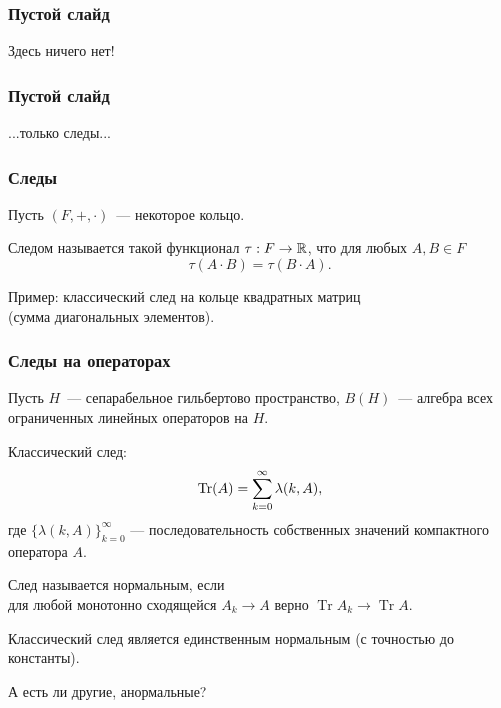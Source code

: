 \begin{frame}\frametitle{Пустой слайд}

	Здесь ничего нет!
\end{frame}

\begin{frame}\frametitle{Пустой слайд}

	...только следы...
\end{frame}




\begin{frame}\frametitle{Следы}
	Пусть $(F, +, \cdot)$~--- некоторое кольцо.
	\begin{ddefinition}
		Следом называется такой функционал $\tau : F \to \mathbb{R}$,
		что для любых $A,B\in F$
		\begin{equation}
			\tau (A\cdot B) = \tau (B\cdot A)
			.
		\end{equation}
	\end{ddefinition}
	\vfill
	Пример: классический след на кольце квадратных матриц
	\\
	(сумма диагональных элементов).


\end{frame}


\begin{frame}\frametitle{Следы на операторах}
	Пусть $H$~--- сепарабельное гильбертово пространство,
	$B(H)$~--- алгебра всех ограниченных линейных операторов на $H$.

	\bigskip

	Классический след:
	$${\rm Tr} (A)= \sum_{k=0}^\infty \lambda(k,A),$$
	где $\{\lambda(k,A)\}_{k=0}^\infty$ --- последовательность собственных значений компактного оператора $A$.

	\bigskip

	След называется нормальным, если
	\\
	для любой монотонно сходящейся $A_k\to A$ верно $\operatorname{Tr} A_k \to\operatorname{Tr} A$.

	\vfill
	Классический след является единственным нормальным (с точностью до константы).

	А есть ли другие, анормальные?


\end{frame}



